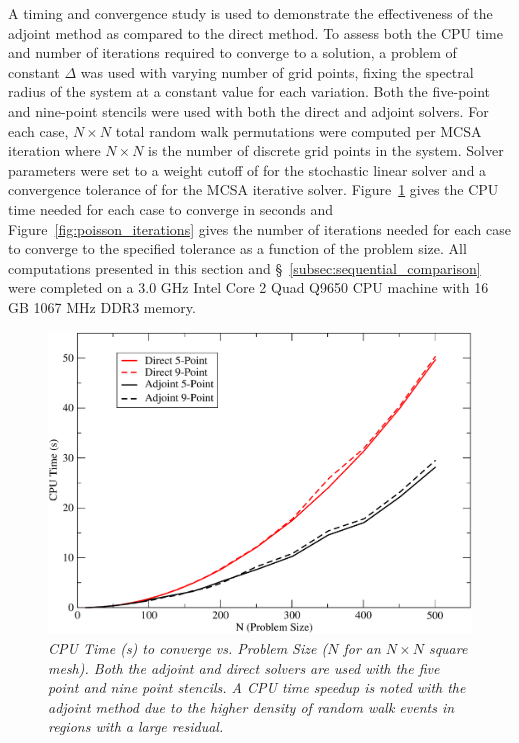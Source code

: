\documentclass[preprint,12pt]{elsarticle}
\begin{document}
A timing and convergence study is used to demonstrate the effectiveness of the
adjoint method as compared to the direct method. To assess both the CPU time
and number of iterations required to converge to a solution, a problem of
constant $\Delta$ was used with varying number of grid points, fixing the
spectral radius of the system at a constant value for each variation. Both the
five-point and nine-point stencils were used with both the direct and adjoint
solvers. For each case, $N \times N$ total random walk permutations were
computed per MCSA iteration where $N \times N$ is the number of discrete grid
points in the system. Solver parameters were set to a weight cutoff of
 for the stochastic linear solver and a convergence tolerance of
 for the MCSA iterative solver.  Figure~\ref{fig:poisson_cpu_time}
gives the CPU time needed for each case to converge in seconds and
Figure~\ref{fig:poisson_iterations} gives the number of iterations needed for
each case to converge to the specified tolerance as a function of the problem
size. All computations presented in this section and
\S~\ref{subsec:sequential_comparison} were completed on a 3.0 GHz Intel Core 2
Quad Q9650 CPU machine with 16 GB 1067 MHz DDR3 memory.
\begin{figure}[ht!]
  \centering
  \includegraphics[width=5in,clip]{dir_adj_cpu.pdf}
  \caption{\sl CPU Time (s) to converge vs. Problem Size ($N$ for an
    $N \times N$ square mesh). Both the adjoint and direct solvers are
    used with the five point and nine point stencils. A CPU time
    speedup is noted with the adjoint method due to the higher density
    of random walk events in regions with a large residual.}
  \label{fig:poisson_cpu_time}
\end{figure}
\end{document}
